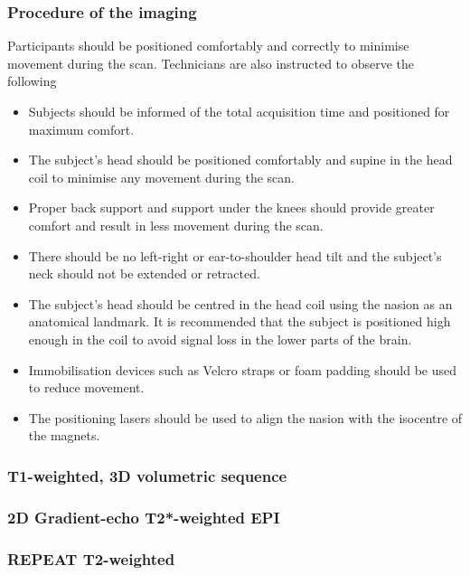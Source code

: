 \subsubsection{Procedure of the imaging}
Participants should be positioned comfortably and correctly to minimise movement during the scan. Technicians are also instructed to observe the following
\begin{itemize}[noitemsep,topsep=0pt]
\item Subjects should be informed of the total acquisition time and positioned for maximum comfort.
\item The subject's head should be positioned comfortably and supine in the head coil to minimise any movement during the scan.
\item Proper back support and support under the knees should provide greater comfort and result in less movement during the scan.
\item There should be no left-right or ear-to-shoulder head tilt and the subject's neck should not be extended or retracted.
\item The subject's head should be centred in the head coil using the nasion as an anatomical landmark. It is recommended that the subject is positioned high enough in the coil to avoid signal loss in the lower parts of the brain.
\item Immobilisation devices such as Velcro straps or foam padding should be used to reduce movement.
\item The positioning lasers should be used to align the nasion with the isocentre of the magnets.
\end{itemize}


\subsubsection{T1-weighted, 3D volumetric sequence}

\subsubsection{2D Gradient-echo T2*-weighted EPI}

\subsubsection{REPEAT T2-weighted}

